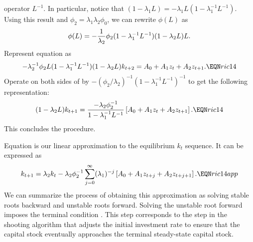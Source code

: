 operator $L^{-1}$. In particular, notice that
$(1-\lambda_1 L) = -\lambda_1 L( 1-\lambda_1^{-1} L^{-1})$.
Using this result and $\phi_2 = \lambda_1 \lambda_2 \phi_0$, we can  rewrite $\phi(L)$
as
$$\phi(L) = -{1\over \lambda_2} \phi_2  (1 -  \lambda_1^{-1}L^{-1}) (1
  - \lambda_2 L)L. $$
Represent
equation   as
$$ -\lambda_2^{-1}  \phi_2 L (1-\lambda_1^{-1} L^{-1}) (1-\lambda_2 L) k_{t+2}
  =A_0+ A_1 z_t + A_2 z_{t+1}.  \EQN ric14 $$
Operate on both sides of  by $-(\phi_2/ \lambda_2)^{-1}
(1-\lambda_1^{-1} L^{-1})^{-1}$ to get
the following representation:
$$ (1-\lambda_2 L) k_{t+1} = {-\lambda_2 \phi_2^{-1}  \over 1 -
\lambda_1^{-1} L^{-1}}
      \left[ A_0+ A_1 z_t + A_2 z_{t+1} \right].  \EQN ric14 $$
      This concludes the procedure.
      \medskip

Equation  is our linear approximation to the equilibrium
$k_t$ sequence.
It can be expressed as
$$ k_{t+1} =  \lambda_2 k_t  -\lambda_2 \phi_2^{-1}
      \sum_{j=0}^\infty (\lambda_1)^{-j}  \left[ A_0+ A_1 z_{t+j} +
A_2 z_{t+j+1} \right].  \EQN ric14app $$
We can summarize the process of obtaining this approximation as
solving stable roots backward and unstable roots forward.
Solving the unstable root forward imposes
the terminal condition .  This step corresponds
to the step in the shooting algorithm that adjusts the initial investment
rate to ensure that
the  capital stock eventually approaches the terminal steady-state capital
stock.



